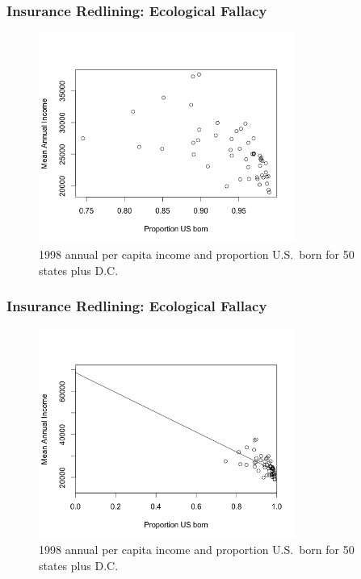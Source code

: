 \begin{frame}
    \frametitle{Insurance Redlining: Ecological Fallacy}
    \begin{figure}
        \centering
        \caption{1998 annual per capita income and proportion U.S.~born for 50
        states plus D.C.}
        \includegraphics[width=0.75\textwidth]{images/FigureFarawayFigure11dot1.png}
    \end{figure}
\end{frame}

\begin{frame}
    \frametitle{Insurance Redlining: Ecological Fallacy}
    \begin{figure}
        \centering
        \caption{1998 annual per capita income and proportion U.S.~born for 50
        states plus D.C.}
        \includegraphics[width=0.75\textwidth]{images/FigureFarawayFigure11dot1b.png}
    \end{figure}
\end{frame}

